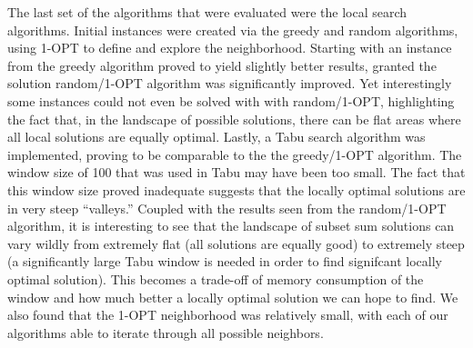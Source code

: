 \documentclass{report}
\begin{document}
The last set of the algorithms that were evaluated were the local search algorithms. Initial instances were created via the greedy and random
algorithms, using 1-OPT to define and explore the neighborhood. Starting with an instance from the greedy algorithm proved to yield slightly
better results, granted the solution random/1-OPT algorithm was significantly improved. Yet interestingly
some instances could not even be solved with with random/1-OPT, highlighting the fact that, in the landscape of possible solutions,
there can be flat areas where all local solutions are equally optimal. 
Lastly, a Tabu search
algorithm was implemented, proving to be comparable to the the greedy/1-OPT algorithm. The window size of 100 that was used in Tabu may
have been too small. The fact that this window size proved inadequate suggests that the locally optimal solutions are in very steep ``valleys.''
Coupled with the results seen from the random/1-OPT algorithm, it is interesting to see that the landscape of subset sum solutions can vary
wildly from extremely flat (all solutions are equally good) to extremely steep (a significantly large Tabu window is needed in order to find
signifcant locally optimal solution). This becomes a trade-off of memory consumption of the window and how much better a locally optimal
solution we can hope to find. We also found that the 1-OPT neighborhood was relatively small, with each of our algorithms able to iterate
through all possible neighbors. 



\end{document}
